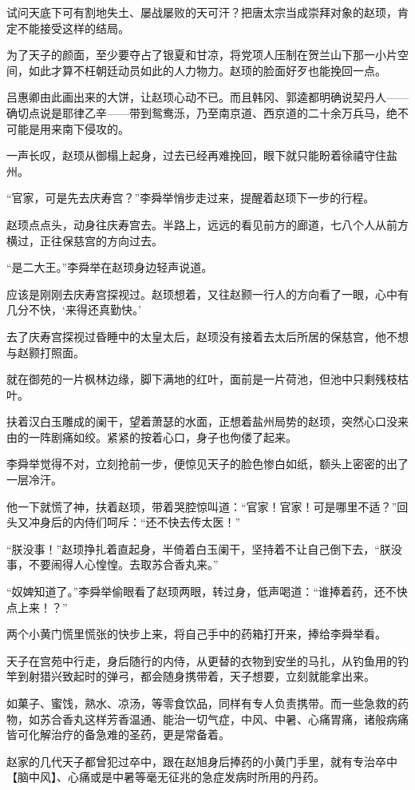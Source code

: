 试问天底下可有割地失土、屡战屡败的天可汗？把唐太宗当成崇拜对象的赵顼，肯定不能接受这样的结局。

为了天子的颜面，至少要夺占了银夏和甘凉，将党项人压制在贺兰山下那一小片空间，如此才算不枉朝廷动员如此的人力物力。赵顼的脸面好歹也能挽回一点。

吕惠卿由此画出来的大饼，让赵顼心动不已。而且韩冈、郭逵都明确说契丹人——确切点说是耶律乙辛——带到鸳鸯泺，乃至南京道、西京道的二十余万兵马，绝不可能是用来南下侵攻的。

一声长叹，赵顼从御榻上起身，过去已经再难挽回，眼下就只能盼着徐禧守住盐州。

“官家，可是先去庆寿宫？”李舜举悄步走过来，提醒着赵顼下一步的行程。

赵顼点点头，动身往庆寿宫去。半路上，远远的看见前方的廊道，七八个人从前方横过，正往保慈宫的方向过去。

“是二大王。”李舜举在赵顼身边轻声说道。

应该是刚刚去庆寿宫探视过。赵顼想着，又往赵颢一行人的方向看了一眼，心中有几分不快，‘来得还真勤快。’

去了庆寿宫探视过昏睡中的太皇太后，赵顼没有接着去太后所居的保慈宫，他不想与赵颢打照面。

就在御苑的一片枫林边缘，脚下满地的红叶，面前是一片荷池，但池中只剩残枝枯叶。

扶着汉白玉雕成的阑干，望着萧瑟的水面，正想着盐州局势的赵顼，突然心口没来由的一阵剧痛如绞。紧紧的按着心口，身子也佝偻了起来。

李舜举觉得不对，立刻抢前一步，便惊见天子的脸色惨白如纸，额头上密密的出了一层冷汗。

他一下就慌了神，扶着赵顼，带着哭腔惊叫道：“官家！官家！可是哪里不适？”回头又冲身后的内侍们呵斥：“还不快去传太医！”

“朕没事！”赵顼挣扎着直起身，半倚着白玉阑干，坚持着不让自己倒下去，“朕没事，不要闹得人心惶惶。去取苏合香丸来。”

“奴婢知道了。”李舜举偷眼看了赵顼两眼，转过身，低声喝道：“谁捧着药，还不快点上来！？”

两个小黄门慌里慌张的快步上来，将自己手中的药箱打开来，捧给李舜举看。

天子在宫苑中行走，身后随行的内侍，从更替的衣物到安坐的马扎，从钓鱼用的钓竿到射猎兴致起时的弹弓，都会随身携带着，天子想要，立刻就能拿出来。

如菓子、蜜饯，熟水、凉汤，等零食饮品，同样有专人负责携带。而一些急救的药物，如苏合香丸这样芳香温通、能治一切气症，中风、中暑、心痛胃痛，诸般病痛皆可化解治疗的备急难的圣药，更是常备着。

赵家的几代天子都曾犯过卒中，跟在赵旭身后捧药的小黄门手里，就有专治卒中【脑中风】、心痛或是中暑等毫无征兆的急症发病时所用的丹药。

